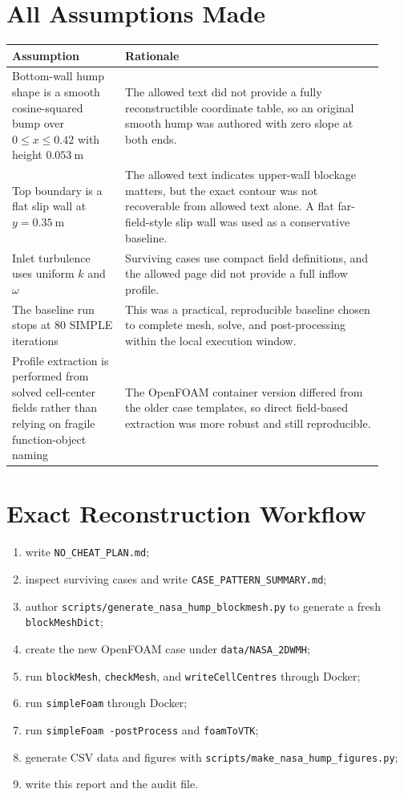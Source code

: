 \documentclass[11pt]{article}
\begin{document}
\section{All Assumptions Made}
\begin{table}[H]
\centering
\begin{tabular}{p{0.28\linewidth} p{0.64\linewidth}}
\toprule
Assumption & Rationale \\
\midrule
Bottom-wall hump shape is a smooth cosine-squared bump over \(0 \le x \le 0.42\) with height \(0.053~\mathrm{m}\) & The allowed text did not provide a fully reconstructible coordinate table, so an original smooth hump was authored with zero slope at both ends. \\
Top boundary is a flat slip wall at \(y=0.35~\mathrm{m}\) & The allowed text indicates upper-wall blockage matters, but the exact contour was not recoverable from allowed text alone. A flat far-field-style slip wall was used as a conservative baseline. \\
Inlet turbulence uses uniform \(k\) and \(\omega\) & Surviving cases use compact field definitions, and the allowed page did not provide a full inflow profile. \\
The baseline run stops at 80 SIMPLE iterations & This was a practical, reproducible baseline chosen to complete mesh, solve, and post-processing within the local execution window. \\
Profile extraction is performed from solved cell-center fields rather than relying on fragile function-object naming & The OpenFOAM container version differed from the older case templates, so direct field-based extraction was more robust and still reproducible. \\
\bottomrule
\end{tabular}
\end{table}

\section{Exact Reconstruction Workflow}
\begin{enumerate}
\item write \texttt{NO\_CHEAT\_PLAN.md};
\item inspect surviving cases and write \texttt{CASE\_PATTERN\_SUMMARY.md};
\item author \texttt{scripts/generate\_nasa\_hump\_blockmesh.py} to generate a fresh \texttt{blockMeshDict};
\item create the new OpenFOAM case under \texttt{data/NASA\_2DWMH};
\item run \texttt{blockMesh}, \texttt{checkMesh}, and \texttt{writeCellCentres} through Docker;
\item run \texttt{simpleFoam} through Docker;
\item run \texttt{simpleFoam -postProcess} and \texttt{foamToVTK};
\item generate CSV data and figures with \texttt{scripts/make\_nasa\_hump\_figures.py};
\item write this report and the audit file.
\end{enumerate}
\end{document}
